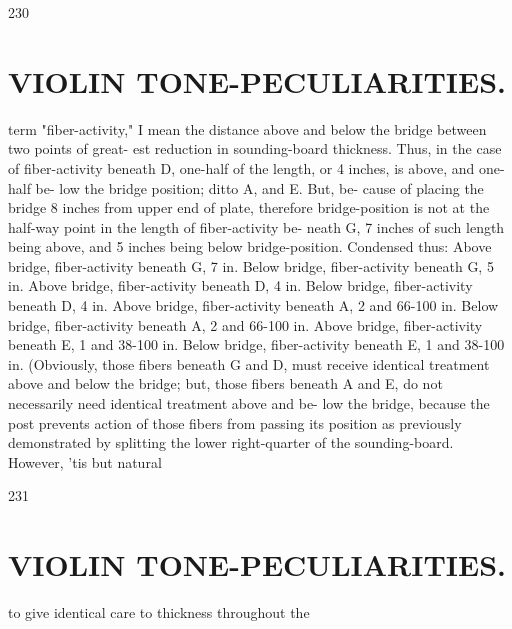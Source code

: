 \documentclass{article}
\begin{document}
230

\section*{VIOLIN TONE-PECULIARITIES.}
term "fiber-activity," I mean the distance above and below the bridge between two points of great- est reduction in sounding-board thickness. Thus, in the case of fiber-activity beneath D, one-half of the length, or 4 inches, is above, and one-half be- low the bridge position; ditto A, and E. But, be- cause of placing the bridge 8 inches from upper end of plate, therefore bridge-position is not at the half-way point in the length of fiber-activity be- neath G, 7 inches of such length being above, and 5 inches being below bridge-position. Condensed thus: Above bridge, fiber-activity beneath G, 7 in. Below bridge, fiber-activity beneath G, 5 in. Above bridge, fiber-activity beneath D, 4 in. Below bridge, fiber-activity beneath D, 4 in. Above bridge, fiber-activity beneath A, 2 and 66-100 in. Below bridge, fiber-activity beneath A, 2 and 66-100 in. Above bridge, fiber-activity beneath E, 1 and 38-100 in. Below bridge, fiber-activity beneath E, 1 and 38-100 in. (Obviously, those fibers beneath G and D, must receive identical treatment above and below the bridge; but, those fibers beneath A and E, do not necessarily need identical treatment above and be- low the bridge, because the post prevents action of those fibers from passing its position as previously demonstrated by splitting the lower right-quarter of the sounding-board. However, 'tis but natural

231

\section*{VIOLIN TONE-PECULIARITIES.}
to give identical care to thickness throughout the
\end{document}
